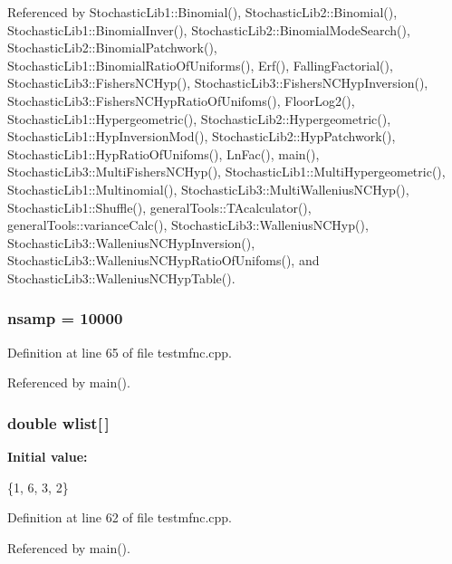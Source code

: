 Referenced by Stochastic\-Lib1\-::\-Binomial(), Stochastic\-Lib2\-::\-Binomial(), Stochastic\-Lib1\-::\-Binomial\-Inver(), Stochastic\-Lib2\-::\-Binomial\-Mode\-Search(), Stochastic\-Lib2\-::\-Binomial\-Patchwork(), Stochastic\-Lib1\-::\-Binomial\-Ratio\-Of\-Uniforms(), Erf(), Falling\-Factorial(), Stochastic\-Lib3\-::\-Fishers\-N\-C\-Hyp(), Stochastic\-Lib3\-::\-Fishers\-N\-C\-Hyp\-Inversion(), Stochastic\-Lib3\-::\-Fishers\-N\-C\-Hyp\-Ratio\-Of\-Unifoms(), Floor\-Log2(), Stochastic\-Lib1\-::\-Hypergeometric(), Stochastic\-Lib2\-::\-Hypergeometric(), Stochastic\-Lib1\-::\-Hyp\-Inversion\-Mod(), Stochastic\-Lib2\-::\-Hyp\-Patchwork(), Stochastic\-Lib1\-::\-Hyp\-Ratio\-Of\-Unifoms(), Ln\-Fac(), main(), Stochastic\-Lib3\-::\-Multi\-Fishers\-N\-C\-Hyp(), Stochastic\-Lib1\-::\-Multi\-Hypergeometric(), Stochastic\-Lib1\-::\-Multinomial(), Stochastic\-Lib3\-::\-Multi\-Wallenius\-N\-C\-Hyp(), Stochastic\-Lib1\-::\-Shuffle(), general\-Tools\-::\-T\-Acalculator(), general\-Tools\-::variance\-Calc(), Stochastic\-Lib3\-::\-Wallenius\-N\-C\-Hyp(), Stochastic\-Lib3\-::\-Wallenius\-N\-C\-Hyp\-Inversion(), Stochastic\-Lib3\-::\-Wallenius\-N\-C\-Hyp\-Ratio\-Of\-Unifoms(), and Stochastic\-Lib3\-::\-Wallenius\-N\-C\-Hyp\-Table().

\subsubsection[{nsamp}]{ nsamp = 10000}\label{rnd_2testmfnc_8cpp_a276446f64722a73896fc821be0e6adf2}


Definition at line 65 of file testmfnc.\-cpp.



Referenced by main().

\subsubsection[{wlist}]{\setlength{\rightskip}{0pt plus 5cm}double wlist[$\,$]}\label{rnd_2testmfnc_8cpp_a0f9888e52a4c32fd392577b5e258d45b}
{\bfseries Initial value\-:}
\begin{DoxyCode}
 
\{1, 6, 3, 2\}
\end{DoxyCode}


Definition at line 62 of file testmfnc.\-cpp.



Referenced by main().

